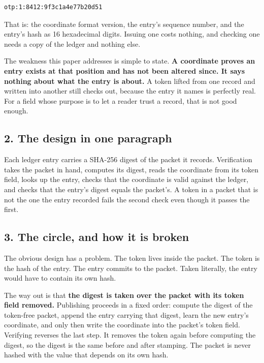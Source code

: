 \documentclass[
  12pt,
  letterpaper,
]{article}
\begin{document}
\begin{verbatim}
otp:1:8412:9f3c1a4e77b20d51
\end{verbatim}

That is: the coordinate format version, the entry's sequence number, and
the entry's hash as 16 hexadecimal digits. Issuing one costs nothing,
and checking one needs a copy of the ledger and nothing else.

The weakness this paper addresses is simple to state. \textbf{A
coordinate proves an entry exists at that position and has not been
altered since. It says nothing about what the entry is about.} A token
lifted from one record and written into another still checks out,
because the entry it names is perfectly real. For a field whose purpose
is to let a reader trust a record, that is not good enough.

\hypertarget{the-design-in-one-paragraph}{%
\subsection{2. The design in one
paragraph}\label{the-design-in-one-paragraph}}

Each ledger entry carries a SHA-256 digest of the packet it records.
Verification takes the packet in hand, computes its digest, reads the
coordinate from its token field, looks up the entry, checks that the
coordinate is valid against the ledger, and checks that the entry's
digest equals the packet's. A token in a packet that is not the one the
entry recorded fails the second check even though it passes the first.

\hypertarget{the-circle-and-how-it-is-broken}{%
\subsection{3. The circle, and how it is
broken}\label{the-circle-and-how-it-is-broken}}

The obvious design has a problem. The token lives inside the packet. The
token is the hash of the entry. The entry commits to the packet. Taken
literally, the entry would have to contain its own hash.

The way out is that \textbf{the digest is taken over the packet with its
token field removed.} Publishing proceeds in a fixed order: compute the
digest of the token-free packet, append the entry carrying that digest,
learn the new entry's coordinate, and only then write the coordinate
into the packet's token field. Verifying reverses the last step. It
removes the token again before computing the digest, so the digest is
the same before and after stamping. The packet is never hashed with the
value that depends on its own hash.
\end{document}
